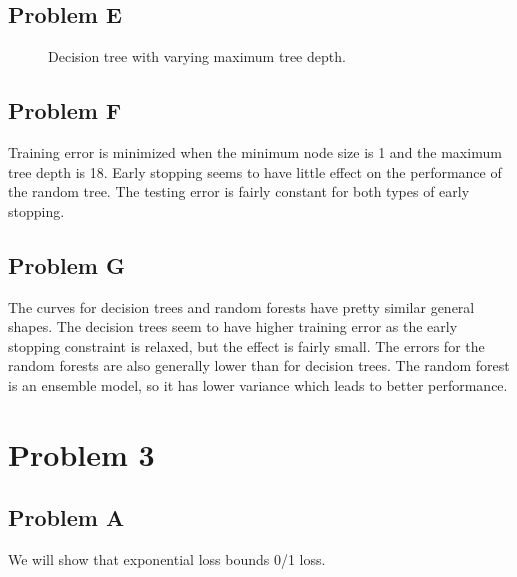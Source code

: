 \documentclass[12pt]{article} %
\begin{document}
\subsection{Problem E}

\begin{figure}[H]
	\vspace{-10mm}
	\caption{Decision tree with varying maximum tree depth.}
\end{figure}

\subsection{Problem F}
Training error is minimized when the minimum node size is 1 and the maximum tree depth is 18.  Early stopping seems to have little effect on the performance of the random tree. The testing error is fairly constant for both types of early stopping.

\subsection{Problem G}
The curves for decision trees and random forests have pretty similar general shapes. The decision trees seem to have higher training error as the early stopping constraint is relaxed, but the effect is fairly small. The errors for the random forests are also generally lower than for decision trees. The random forest is an ensemble model, so it has lower variance which leads to better performance.

\section{Problem 3}

\subsection{Problem A}
We will show that exponential loss bounds 0/1 loss.
\end{document}

